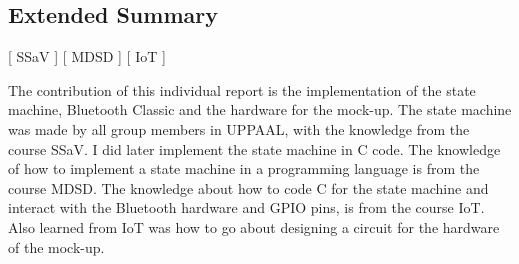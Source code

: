 \subsection*{Extended Summary}
[ SSaV ] [ MDSD ] [ IoT ] 
\newline

The contribution of this individual report is the implementation of the state machine, Bluetooth Classic and the hardware for the mock-up.
The state machine was made by all group members in UPPAAL, with the knowledge from the course SSaV.
I did later implement the state machine in C code.
The knowledge of how to implement a state machine in a programming language is from the course MDSD.
The knowledge about how to code C for the state machine and interact with the Bluetooth hardware and GPIO pins, is from the course IoT. Also learned from IoT was how to go about designing a circuit for the hardware of the mock-up.